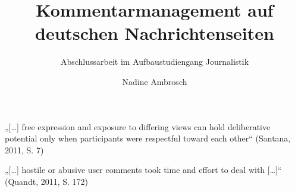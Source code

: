 \documentclass[12pt,parskip=full,ngerman,draft]{scrreprt} %
\title{Kommentarmanagement auf deutschen Nachrichtenseiten}
\subtitle{Abschlussarbeit im Aufbaustudiengang Journalistik}
\author{Nadine Ambrosch}
\begin{document}
\begin{spacing}{1}
  \maketitle
\end{spacing}

\tableofcontents
\listoftables




















%
%
%
%
%
%
%
%
%

„[\ldots] free expression and exposure to differing views can hold deliberative
potential only when participants were respectful toward each other“ (Santana,
2011, S. 7)




„[\ldots] hostile or abusive user comments took time and effort to deal with
[\ldots]“ (Quandt, 2011, S. 172)
\end{document}
